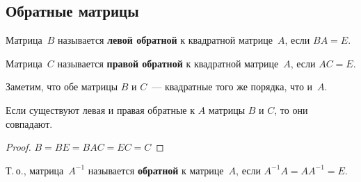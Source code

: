 \subsection{Обратные матрицы}
Матрица~$B$ называется \textbf{левой обратной} к квадратной матрице~$A$, если $BA = E$.

Матрица~$C$ называется \textbf{правой обратной} к квадратной матрице~$A$, если $AC = E$.

Заметим, что обе матрицы $B$ и $C$~--- квадратные того же порядка, что и~$A$.

\begin{statement}
Если существуют левая и правая обратные к $A$ матрицы $B$ и $C$, то они совпадают.
\end{statement}
\begin{proof}
$B = BE = BAC = EC = C$
\end{proof}

 Т.\,о., матрица~$A^{-1}$ называется \textbf{обратной} к матрице~$A$, если $A^{-1} A = A A^{-1} = E$.

